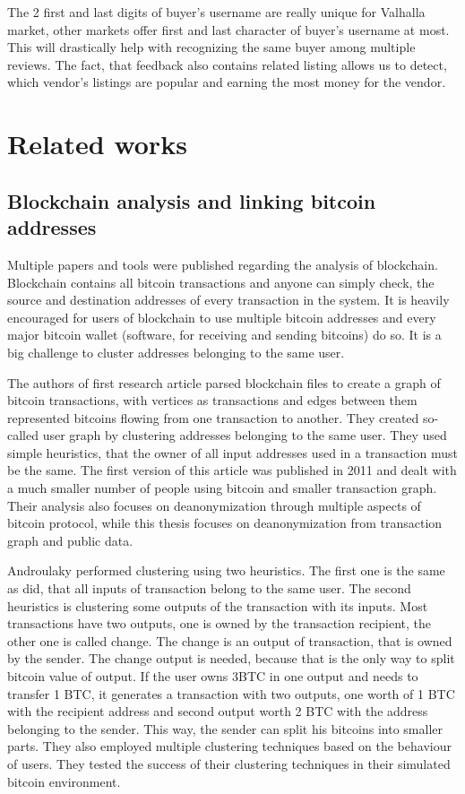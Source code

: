 \documentclass[
  digital, %
  table,   %
  lof,     %
  lot,     %
  oneside
]{fithesis3}
\begin{document}
The 2 first and last digits of buyer's username are really unique for Valhalla market,
other markets offer first and last character of buyer's username at most.
This will drastically help with recognizing the same buyer among multiple reviews.
The fact, that feedback also contains related listing allows us to
detect, which vendor's listings are popular and earning the most money for the vendor.

\chapter{Related works}
\section{Blockchain analysis and linking bitcoin addresses}

Multiple papers and tools were published regarding the analysis of blockchain.
Blockchain contains all bitcoin transactions and anyone can simply check,
the source and destination addresses of every transaction in the system.
It is heavily encouraged for users of blockchain to use multiple bitcoin addresses
 and every major bitcoin wallet (software, for receiving and sending bitcoins) do so.
 It is a big challenge to cluster addresses belonging to the same user.
 
The authors of first research article \parencite{reid2013analysis}
 parsed blockchain files to create a graph of bitcoin transactions, with vertices as transactions
 and edges between them represented bitcoins flowing from one transaction to another.
 They created so-called user graph by clustering addresses belonging to the same user.
 They used simple heuristics, that the owner of all input addresses used in a transaction must be the same. The first version of this article  
was published in 2011 and dealt with a much smaller number of people using bitcoin and smaller transaction graph.
Their analysis also focuses on deanonymization through multiple aspects of bitcoin protocol,
while this thesis focuses on deanonymization from transaction graph and public data.

Androulaky \parencite{androulaki2013evaluating} performed clustering using two heuristics.
The first one is the same as \parencite{reid2013analysis} did, that all inputs of transaction
belong to the same user. The second heuristics is clustering some outputs of the transaction with its inputs.
Most transactions have two outputs, one is owned by the transaction recipient,
the other one is called change. The change is an output of transaction, that is owned by
the sender. The change output is needed, because that is the only way to split bitcoin value of output.
 If the user owns 3BTC in one output and needs to transfer 1 BTC, it generates a transaction with two outputs, one worth of 1 BTC with the recipient address and second output worth 2 BTC 
 with the address belonging to the sender. This way, the sender can split his bitcoins into smaller parts.
 They also employed multiple clustering techniques based on the behaviour of users.
 They tested the success of their clustering techniques in their simulated bitcoin 
 environment.
\end{document}
